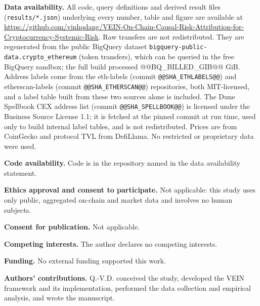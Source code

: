 \documentclass[referee,pdflatex,sn-mathphys-ay]{sn-jnl}
\theoremstyle{thmstyleone}%
\theoremstyle{thmstyletwo}%
\theoremstyle{thmstylethree}%
\begin{document}
\backmatter


\noindent\textbf{Data availability.} All code, query definitions and derived result files (\texttt{results/*.json}) underlying
every number, table and figure are available at \url{https://github.com/vinhqdang/VEIN-On-Chain-Causal-Risk-Attribution-for-Cryptocurrency-Systemic-Risk}.
Raw transfers are not redistributed. They are regenerated from the public BigQuery dataset \texttt{bigquery-public-data.crypto\_ethereum}
(token transfers), which can be queried in the free BigQuery sandbox; the full build processed @@BQ_BILLED_GIB@@ GiB. Address labels come
from the eth-labels (commit \texttt{@@SHA_ETHLABELS@@}) and etherscan-labels (commit \texttt{@@SHA_ETHERSCAN@@}) repositories, both
MIT-licensed, and a label table built from these two sources alone is included. The Dune Spellbook CEX address list (commit
\texttt{@@SHA_SPELLBOOK@@}) is licensed under the Business Source License 1.1; it is fetched at the pinned commit at run time, used
only to build internal label tables, and is not redistributed. Prices are from CoinGecko and protocol TVL from DefiLlama. No
restricted or proprietary data were used.

\noindent\textbf{Code availability.} Code is in the repository named in the data availability statement.

\noindent\textbf{Ethics approval and consent to participate.} Not applicable: this study
uses only public, aggregated on-chain and market data and involves no human subjects.

\noindent\textbf{Consent for publication.} Not applicable.

\noindent\textbf{Competing interests.} The author declares no competing interests.

\noindent\textbf{Funding.} No external funding supported this work.

\noindent\textbf{Authors' contributions.} Q.-V.D. conceived the study, developed the VEIN
framework and its implementation, performed the data collection and empirical analysis,
and wrote the manuscript.
\end{document}
